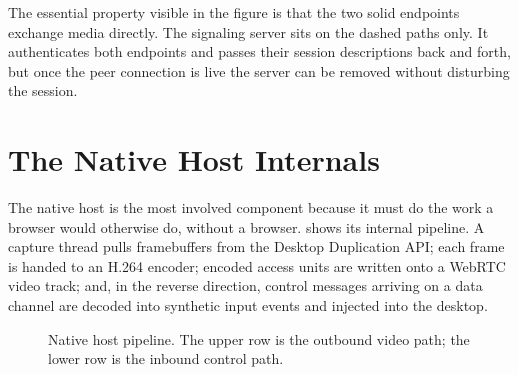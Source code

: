 The essential property visible in the figure is that the two solid endpoints
exchange media directly. The signaling server sits on the dashed paths only. It
authenticates both endpoints and passes their session descriptions back and
forth, but once the peer connection is live the server can be removed without
disturbing the session.

\section{The Native Host Internals}

The native host is the most involved component because it must do the work a
browser would otherwise do, without a browser.  shows its
internal pipeline. A capture thread pulls framebuffers from the Desktop
Duplication API; each frame is handed to an H.264 encoder; encoded access units
are written onto a WebRTC video track; and, in the reverse direction, control
messages arriving on a data channel are decoded into synthetic input events and
injected into the desktop.

\begin{figure}[H]
\centering
{}
\caption{Native host pipeline. The upper row is the outbound video path; the
lower row is the inbound control path.}
\label{fig:nativehost}
\end{figure}

